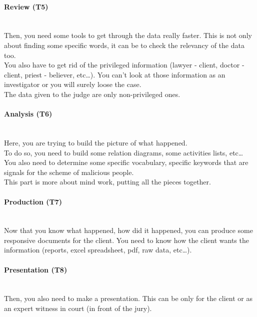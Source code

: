 \paragraph{Review (T5)}~\\
Then, you need some tools to get through the data really faster. This is not only about finding some specific words, it can be to check the relevancy of the data too.\\
You also have to get rid of the privileged information (lawyer - client, doctor - client, priest - believer, etc\ldots). You can't look at those information as an investigator or you will surely loose the case.\\
The data given to the judge are only non-privileged ones.
\paragraph{Analysis (T6)}~\\
Here, you are trying to build the picture of what happened.\\
To do so, you need to build some relation diagrams, some activities lists, etc\ldots\\
You also need to determine some specific vocabulary, specific keywords that are signals for the scheme of malicious people.\\
This part is more about mind work, putting all the pieces together.
\paragraph{Production (T7)}~\\
Now that you know what happened, how did it happened, you can produce some responsive documents for the client. You need to know how the client wants the information (reports, excel spreadsheet, pdf, raw data, etc\ldots).
\paragraph{Presentation (T8)}~\\
Then, you also need to make a presentation. This can be only for the client or as an expert witness in court (in front of the jury).

